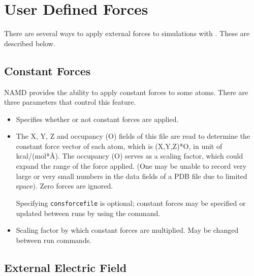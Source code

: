 
\section{User Defined Forces}
\label{section:userdef}



There are several ways to apply external forces to simulations with \NAMD.
These are described below.


\subsection{Constant Forces}

NAMD provides the ability to apply constant forces to some atoms.
There are three parameters that control this feature.

\begin{itemize}

\item
{}
{Specifies whether or not constant forces are applied.}

\item
{}
{
The X, Y, Z and occupancy (O) fields of this file are read to
determine the constant force vector of each atom, which is
(X,Y,Z)*O, in unit of kcal/(mol*\AA). The occupancy (O) serves as
a scaling factor, which could expand the range of the force
applied. (One may be unable to record very large or very small
numbers in the data fields of a PDB file due to limited space).
Zero forces are ignored.

Specifying {\tt consforcefile} is optional; constant forces may be specified
or updated between runs by using the  command.
}

\item
{}
{Scaling factor by which constant forces are multiplied.  May be changed between run commands.}

\end{itemize}


\subsection{External Electric Field}

